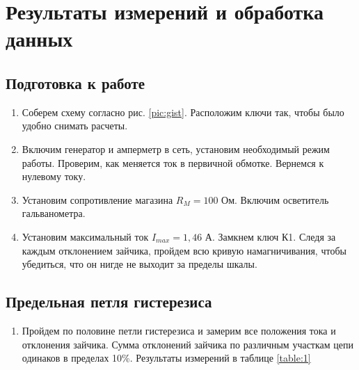 \documentclass[a4paper,12pt]{article}
\begin{document}
\section{Результаты измерений и обработка данных}

\subsection{Подготовка к работе}

\begin{enumerate}
    \item Соберем схему согласно рис. \ref{pic:gist}. Расположим ключи так, чтобы было удобно снимать расчеты.
    \item Включим генератор и амперметр в сеть, установим необходимый режим работы. Проверим, как меняется ток в первичной обмотке. Вернемся к нулевому току.
    \item Установим сопротивление магазина $R_M = 100$ Ом. Включим осветитель гальванометра.
    \item Установим максимальный ток $I_{max} = 1,46$ А. Замкнем ключ К1. Следя за каждым отклонением зайчика, пройдем всю кривую намагничивания, чтобы убедиться, что он нигде не выходит за пределы шкалы.
\end{enumerate}

\subsection{Предельная петля гистерезиса}

\begin{enumerate}[resume]
    \item Пройдем по половине петли гистерезиса и замерим все положения тока и отклонения зайчика. Сумма отклонений зайчика по различным участкам цепи одинаков в пределах 10\%. Результаты измерений в таблице \ref{table:1}
\end{enumerate}
\end{document}
